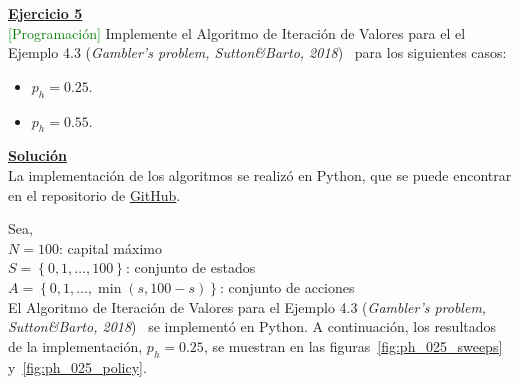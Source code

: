 \indent\underline{\textbf{Ejercicio 5}}\\
\textcolor{green}{[Programación]} Implemente el Algoritmo de Iteración de Valores para el el Ejemplo 4.3 (\textit{Gambler’s problem, Sutton\&Barto, 2018})~\cite{Sutton2018} para los siguientes casos:

\begin{itemize}
    \item $p_h = 0.25$.
    \item $p_h = 0.55$.
\end{itemize}

\indent\underline{\textbf{Solución}}\\
La implementación de los algoritmos se realizó en Python, que se puede encontrar en el repositorio de \href{https://github.com/MasterUBA-DM-KD/Aprendizaje_Reforzado/blob/5ae50da937b14f0a11c416e40019a4b5661dd51b/docs/guia/3/notebooks/utils.py}{GitHub}.

Sea,\\
$N=100$: capital máximo\\
$S=\left\{0, 1, \ldots, 100\right\}$: conjunto de estados\\
$A=\left\{0, 1, \ldots, \min(s, 100-s)\right\}$: conjunto de acciones\\

El Algoritmo de Iteración de Valores para el Ejemplo 4.3 (\textit{Gambler’s problem, Sutton\&Barto, 2018})~\cite{Sutton2018} se implementó en Python\footnotemark.
A continuación, los resultados de la implementación, $p_h = 0.25$, se muestran en las figuras~\ref{fig:ph_025_sweeps} y~\ref{fig:ph_025_policy}.


